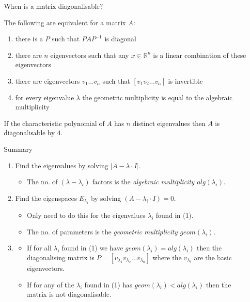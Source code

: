 \documentclass{beamer}
\begin{document}
\begin{frame}{When is a matrix diagonalisable?}
\begin{theorem}
The following are equivalent for a matrix $A$:
\begin{enumerate}
	\item there is a $P$ such that $PAP^{-1}$ is diagonal
	\item there are $n$ eigenvectors such that any $x\in \mathbb{R}^n$ is a linear combination of these eigenvectors
	\item there are eigenvectors $v_1\dots v_n$ such that $\left[v_1 v_2\dots v_n \right]$ is invertible
	\item for every eigenvalue $\lambda$ the geometric multiplicity is equal to the algebraic multiplicity
\end{enumerate}
\end{theorem}

\begin{lemma}
If the characteristic polynomial of $A$ has $n$ distinct eigenvalues then $A$ is diagonalisable by $4$.
\end{lemma}
\end{frame}

\begin{frame}{Summary}
\begin{enumerate}
	\item Find the eigenvalues by solving $\left|A-\lambda\cdot I\right|$.
	\begin{itemize}
		\item The no. of $(\lambda - \lambda_i)$ factors is the \emph{algebraic multiplicity $alg(\lambda_i)$}.
	\end{itemize}
	\vfill
	\item Find the eigenspaces $E_{\lambda_i}$ by solving $(A-\lambda_i\cdot I) = 0$.
	\begin{itemize}
		\item Only need to do this for the eigenvalues $\lambda_i$ found in (1).
		\item The no. of parameters is the \emph{geometric multiplicity $geom(\lambda_i)$}.
	\end{itemize}\vfill
	\item 
	\begin{itemize}
		\item If for all $\lambda_i$ found in (1) we have $geom(\lambda_i) = alg(\lambda_i)$
		then the diagonalising matrix is $P= \left[v_{\lambda_1} v_{\lambda_2} \dots v_{\lambda_n}\right]$
		where the $v_{\lambda_i}$ are the basic eigenvectors.
		\item If for any of the $\lambda_i$ found in (1) has $geom(\lambda_i) < alg(\lambda_i)$
		then the matrix is not diagonalisable.
	\end{itemize}
\end{enumerate}
\end{frame}
\end{document}
